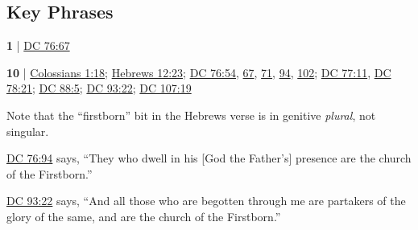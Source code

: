 		
		
\subsection{Key Phrases} %
	\label{CHURCH-PHRASES}
	

	\begin{compactdesc}
	
		\item[church of Enoch] \textbf{1} | \hyperref[DC76-67]{DC 76:67}
		
		\item[church of the firstborn] \textbf{10} | \hyperref[COLOSSIANS-1-18]{Colossians 1:18}; \hyperref[HEBREWS-12-23]{Hebrews 12:23}; \hyperref[DC76-54]{DC 76:54}, \hyperref[DC76-67]{67}, \hyperref[DC76-71]{71}, \hyperref[DC76-94]{94}, \hyperref[DC76-102]{102}; \hyperref[DC77-11]{DC 77:11}, \hyperref[DC78-21]{DC 78:21}; \hyperref[DC88-5]{DC 88:5}; \hyperref[DC93-22]{DC 93:22}; \hyperref[DC107-19]{DC 107:19}
			\begin{compactdesc}
				\item[Bible anchor verses] \phantom{.}
					\begin{compactdesc}
						\item[Hebrews 12:23] 
					\end{compactdesc}
				\item[Commentary] Note that the ``firstborn'' bit in the Hebrews verse is in genitive \textit{plural}, not singular.
				
					\hyperref[DC76-94]{DC 76:94} says, ``They who dwell in his [God the Father's] presence are the church of the Firstborn.'' 
					
					\hyperref[DC93-22]{DC 93:22} says, ``And all those who are begotten through me are partakers of the glory of the same, and are the church of the Firstborn.''
			\end{compactdesc}
			
	\end{compactdesc}
	

